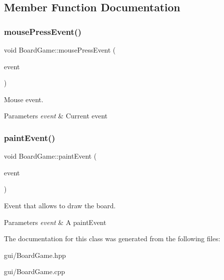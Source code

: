 \subsection{Member Function Documentation}
\mbox{\label{class_board_game_a98fa3527ac66267cd04d29c382e00608}} 
\subsubsection{\texorpdfstring{mouse\+Press\+Event()}{mousePressEvent()}}
{\footnotesize\ttfamily void Board\+Game\+::mouse\+Press\+Event (\begin{DoxyParamCaption}\item[{Q\+Mouse\+Event $\ast$}]{event }\end{DoxyParamCaption})\hspace{0.3cm}{\ttfamily [protected]}}



Mouse event. 


\begin{DoxyParams}{Parameters}
{\em event} & Current event \\
\hline
\end{DoxyParams}
\mbox{\label{class_board_game_a070ae1aadf33d752862a71e237281f0c}} 
\subsubsection{\texorpdfstring{paint\+Event()}{paintEvent()}}
{\footnotesize\ttfamily void Board\+Game\+::paint\+Event (\begin{DoxyParamCaption}\item[{Q\+Paint\+Event $\ast$}]{event }\end{DoxyParamCaption})\hspace{0.3cm}{\ttfamily [protected]}}



Event that allows to draw the board. 


\begin{DoxyParams}{Parameters}
{\em event} & A paint\+Event \\
\hline
\end{DoxyParams}


The documentation for this class was generated from the following files\+:\begin{DoxyCompactItemize}
\item 
gui/Board\+Game.\+hpp\item 
gui/Board\+Game.\+cpp\end{DoxyCompactItemize}
